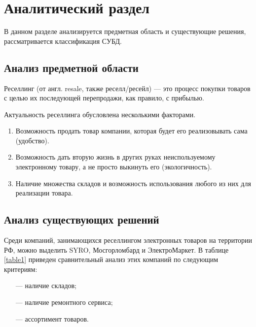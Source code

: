 \chapter{Аналитический раздел}

В данном разделе анализируется предметная область и существующие решения, рассматривается классификация СУБД.

\section{Анализ предметной области}
Реселлинг (от англ. resale, также реселл/ресейл) --- это процесс покупки товаров с целью их последующей перепродажи, как правило, с прибылью.

Актуальность реселлинга обусловлена несколькими факторами.
\begin{enumerate}
	\item Возможность продать товар компании, которая будет его реализовывать сама (удобство).
	\item Возможность дать вторую жизнь в других руках неиспользуемому электронному товару, а не просто выкинуть его (экологичность).
	\item Наличие множества складов и возможность использования любого из них для реализации товара.
\end{enumerate}

\section{Анализ существующих решений}
Среди компаний, занимающихся реселлингом электронных товаров на территории РФ, можно выделить SYRO, Мосгорломбард и ЭлектроМаркет.
В таблице \ref{table1} приведен сравнительный анализ этих компаний по следующим критериям:
\begin{itemize}
	\item[---] наличие складов;
	\item[---] наличие ремонтного сервиса;
	\item[---] ассортимент товаров.
\end{itemize}

